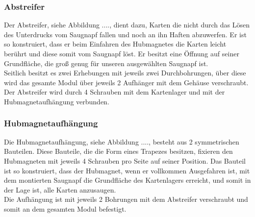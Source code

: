 \subsubsection{Abstreifer}

Der Abstreifer, siehe Abbildung ...., dient dazu, Karten die nicht durch das Lösen des Unterdrucks vom Saugnapf fallen und noch an ihn Haften
abzuwerfen. Er ist so konstruiert, dass er beim Einfahren des Hubmagnetes die Karten leicht berührt und diese somit vom
Saugnapf löst. Er besitzt eine Öffnung auf seiner Grundfläche, die groß genug für unseren ausgewählten Saugnapf ist.\\
Seitlich besitzt es zwei Erhebungen mit jeweils zwei Durchbohrungen, über diese wird das gesamte Modul über jeweils 2 Aufhänger
mit dem Gehäuse verschraubt. \\
Der Abstreifer wird durch 4 Schrauben mit dem Kartenlager und mit der Hubmagnetaufhängung  verbunden.

\subsubsection{Hubmagnetaufhängung}

Die Hubmagnetaufhängung, siehe Abbildung ...., besteht aus 2 symmetrischen Bauteilen. Diese Bauteile, die die Form eines Trapezes besitzen, fixieren den
Hubmagneten mit jeweils 4 Schrauben pro Seite auf seiner Position. Das Bauteil ist so konstruiert, dass der Hubmagnet, wenn er
vollkommen Ausgefahren ist, mit dem montierten Saugnapf die Grundfläche des Kartenlagers erreicht, und somit in der Lage ist,
alle Karten anzusaugen.\\
Die Aufhängung ist mit jeweils 2 Bohrungen mit dem Abstreifer verschraubt und somit an dem gesamten Modul befestigt.

